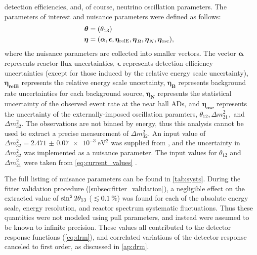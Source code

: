 detection efficiencies,
and, of course, neutrino oscillation parameters.
The parameters of interest and nuisance parameters were defined as follows:
\begin{align}
    \begin{split}
        \boldsymbol{\theta} &= (\theta_{13}) \\
        \boldsymbol{\eta} &= (
            \boldsymbol{\alpha},
            \boldsymbol{\epsilon},
            \boldsymbol{\eta_{\text{relE}}},
            \boldsymbol{\eta}_B,
            \boldsymbol{\eta}_N,
            \boldsymbol{\eta_{\text{osc}}}),
    \end{split}
\end{align}
where the nuisance parameters are collected into smaller vectors.
The vector $\boldsymbol{\alpha}$ represents reactor flux uncertainties,
$\boldsymbol{\epsilon}$ represents detection efficiency uncertainties
(except for those induced by the relative energy scale uncertainty),
$\boldsymbol{\eta_{\text{relE}}}$ represents the relative energy scale uncertainty,
$\boldsymbol{\eta_B}$ represents background rate uncertainties for each background source,
$\boldsymbol{\eta_N}$ represents the statistical uncertainty
of the observed event rate at the near hall ADs,
and $\boldsymbol{\eta_{\text{osc}}}$ represents the uncertainty
of the externally-imposed oscillation paramters, $\theta_{12}, \Delta m^2_{21},$
and $\Delta m^2_{32}${}.
The observations are not binned by energy,
thus this analysis cannot be used to extract
a precise measurement of $\Delta m^2_{32}${}.
An input value of $\Delta m^2_{32} = \SI{2.471(70)e-3}{\eV\squared}$
was supplied from \cite{ngd2018}, and
the uncertainty in $\Delta m^2_{32}${} was implemented as a nuisance parameter.
The input values for $\theta_{12}$ and $\Delta m^2_{21}$
were taken from \cref{eq:current_values} \cite{pdg}.

The full listing of nuisance parameters
can be found in \cref{tab:systs}.
During the fitter validation procedure (\cref{subsec:fitter_validation}),
a negligible effect on the extracted value of $\sin^22\theta_{13}$
($\lesssim\SI{0.1}{\percent}$)
was found for each of the absolute energy scale, energy resolution,
and reactor \nuebar{} spectrum systematic fluctuations.
Thus these quantities were not modeled using pull parameters,
and instead were assumed to be known to infinite precision.
These values all contributed to the detector response functions
(\cref{eq:drm}),
and correlated variations of the detector response
canceled to first order, as discussed in \cref{ap:drm}.

